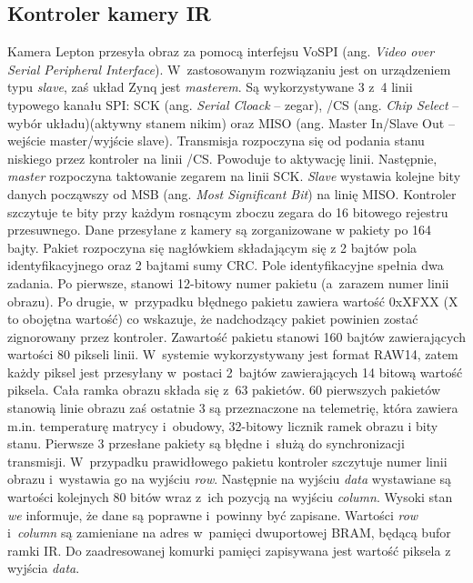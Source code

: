 \subsection{Kontroler kamery IR}
Kamera Lepton przesyła obraz za pomocą interfejsu VoSPI (ang. \textit{Video over Serial Peripheral Interface}). 
W~zastosowanym rozwiązaniu jest on urządzeniem typu \textit{slave}, zaś układ Zynq jest \textit{masterem}. 
Są wykorzystywane 3 z~4 linii typowego kanału SPI: SCK (ang. \textit{Serial Cloack} -- zegar), /CS (ang. \textit{Chip Select} -- wybór układu)(aktywny stanem nikim) oraz MISO (ang. {Master In/Slave Out} – wejście master/wyjście slave).
Transmisja rozpoczyna się od podania stanu niskiego przez kontroler na linii /CS. 
Powoduje to aktywację linii. 
Następnie, \textit{master} rozpoczyna taktowanie zegarem na linii SCK. \textit{Slave} wystawia kolejne bity danych począwszy od MSB (ang. \textit{Most Significant Bit}) na linię MISO. 
Kontroler szczytuje te bity przy każdym rosnącym zboczu zegara do 16 bitowego rejestru przesuwnego.
Dane przesyłane z kamery są zorganizowane w pakiety po 164 bajty. Pakiet rozpoczyna się nagłówkiem składającym się z 2 bajtów pola identyfikacyjnego oraz 2 bajtami sumy CRC. 
Pole identyfikacyjne spełnia dwa zadania. 
Po pierwsze, stanowi 12-bitowy numer pakietu (a~zarazem numer linii obrazu). 
Po drugie, w~przypadku błędnego pakietu zawiera wartość 0xXFXX (X to obojętna wartość) co wskazuje, że nadchodzący pakiet powinien zostać zignorowany przez kontroler. 
Zawartość pakietu stanowi 160 bajtów zawierających wartości 80 pikseli linii. 
W~systemie wykorzystywany jest format RAW14, zatem każdy piksel jest przesyłany w~postaci 2~bajtów zawierających 14 bitową wartość piksela.
Cała ramka obrazu składa się z~63 pakietów. 
60 pierwszych pakietów stanowią linie obrazu zaś ostatnie 3 są przeznaczone na telemetrię, która zawiera m.in. temperaturę matrycy  i~obudowy, 32-bitowy licznik ramek obrazu i bity stanu. %
Pierwsze 3 przesłane pakiety są błędne i~służą do synchronizacji transmisji.
W~przypadku prawidłowego pakietu kontroler szczytuje numer linii obrazu i~wystawia go na wyjściu \textit{row}. 
Następnie na wyjściu \textit{data} wystawiane są wartości kolejnych 80 bitów wraz z~ich pozycją na wyjściu \textit{column}. 
Wysoki stan \textit{we} informuje, że dane są poprawne i~powinny być zapisane.
Wartości \textit{row} i~\textit{column} są zamieniane na adres w~pamięci dwuportowej BRAM, będącą bufor ramki IR. Do zaadresowanej komurki pamięci zapisywana jest wartość piksela z wyjścia \textit{data}. %

